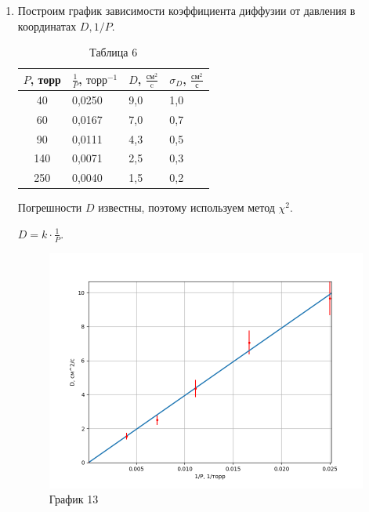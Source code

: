 \documentclass[a4paper,12pt]{article} %
\begin{document}
\begin{enumerate}
\newpage

\item Построим график зависимости коэффициента диффузии от давления в координатах $D, 1/P$.

\begin{table}[h!]
	\centering
	\begin{tabular}{|c|l|l|l|}
		\hline
		$P$, торр & \multicolumn{1}{c|}{$\frac{1}{P}$,  $\text{торр}^{-1}$} & \multicolumn{1}{c|}{$D$, $\frac{\text{см}^2}{\text{c}}$} & \multicolumn{1}{c|}{$\sigma_{D}$, $\frac{\text{см}^2}{\text{с}}$} \\ \hline
		40        & 0,0250                                                  & 9,0                                                      & 1,0                                                               \\ \hline
		60        & 0,0167                                                  & 7,0                                                      & 0,7                                                               \\ \hline
		90        & 0,0111                                                  & 4,3                                                      & 0,5                                                               \\ \hline
		140       & 0,0071                                                  & 2,5                                                      & 0,3                                                               \\ \hline
		250       & 0,0040                                                  & 1,5                                                      & 0,2                                                               \\ \hline
	\end{tabular}
\caption*{Таблица 6}
\end{table}

Погрешности $D$ известны, поэтому используем метод $\chi^2$.


$D = k\cdot \frac{1}{P}$.

\begin{figure}[h!]
	\centering
	\includegraphics[scale=0.8]{Pictures/D(P).png}
	\caption*{График 13}
\end{figure}


\end{enumerate}
\end{document}
